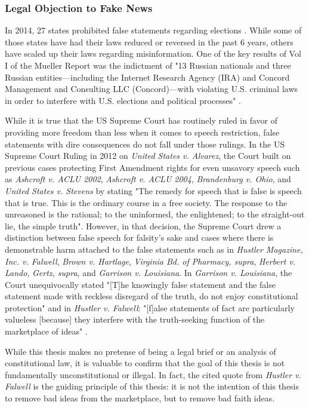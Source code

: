 \documentclass[12pt]{article}
\begin{document}
\subsubsection{Legal Objection to Fake News}
In 2014, 27 states prohibited false statements regarding elections \cite{Vasilogambros2019political}. While some of those states have had their laws reduced or reversed in the past 6 years, others have scaled up their laws regarding misinformation. One of the key results of Vol I of the Mueller Report was the indictment of "13 Russian nationals and three Russian entities—including the Internet
Research Agency (IRA) and Concord Management and Consulting LLC (Concord)—with violating U.S. criminal laws in order to interfere with U.S. elections and political processes" \cite{mueller2019mueller,mueller2020internet}.

While it is true that the US Supreme Court has routinely ruled in favor of providing more freedom than less when it comes to speech restriction, false statements with dire consequences do not fall under those rulings. In the US Supreme Court Ruling in 2012 on \textit{United States v. Alvarez}, the Court built on previous cases protecting First Amendment rights for even unsavory speech such as  \textit{Ashcroft v. ACLU 2002}, \textit{Ashcroft v. ACLU 2004}, \textit{Brandenburg v. Ohio}, and \textit{United States v. Stevens} by stating "The remedy for speech that is false is speech that is true. This is the ordinary course in a free society. The response to the unreasoned is the rational; to the uninformed, the enlightened; to the straight-out lie, the simple truth"\cite{scotus2012alvarez}. However, in that decision, the Supreme Court drew a distinction between false speech for falsity's sake and cases where there is demonstrable harm attached to the false statements such as in \textit{Hustler Magazine, Inc. v. Falwell}, \textit{Brown v. Hartlage}, \textit{Virginia Bd. of Pharmacy, supra}, \textit{Herbert v. Lando}, \textit{Gertz, supra}, and \textit{Garrison v. Louisiana}. In \textit{Garrison v. Louisiana}, the Court unequivocally stated "[T]he knowingly false statement and the false statement made with reckless disregard of the truth, do not enjoy constitutional protection" \cite{scotus1964garrison} and in \textit{Hustler v. Falwell}: "[f]alse statements of fact are particularly valueless [because] they interfere with the truth-seeking function of the marketplace of ideas" \cite{scotus1987hustler}. 

While this thesis makes no pretense of being a legal brief or an analysis of constitutional law, it is valuable to confirm that the goal of this thesis is not fundamentally unconstitutional or illegal. In fact, the cited quote from \textit{Hustler v. Falwell} is the guiding principle of this thesis: it is not the intention of this thesis to remove bad ideas from the marketplace, but to remove bad faith ideas.
\end{document}

